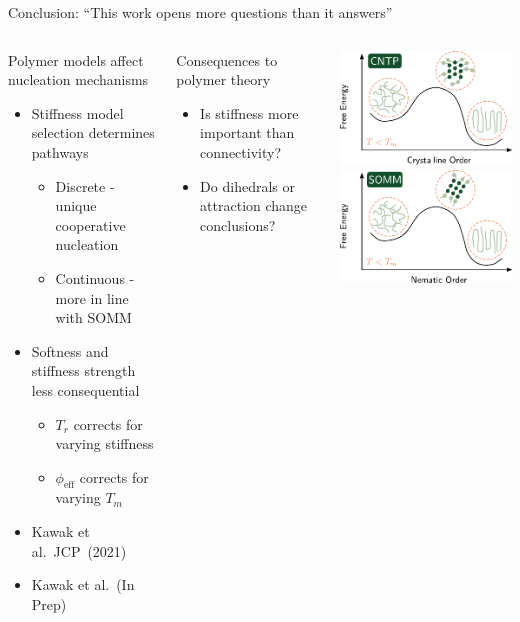 \documentclass[aspectratio=169]{beamer}
\begin{document}
\begin{frame}[c]{Conclusion: ``This work opens more questions than it answers''}

    \begin{columns}[T, onlytextwidth]

      \vspace{-\baselineskip}
      \begin{block}{Polymer models affect nucleation mechanisms}
        \begin{itemize}
            \item Stiffness model selection determines pathways
          \begin{itemize}
            \item Discrete - unique cooperative nucleation
            \item Continuous - more in line with SOMM
          \end{itemize}
          \item Softness and stiffness strength less consequential
          \begin{itemize}
            \item $T_{r}$ corrects for varying stiffness
            \item $\phi_{\mathrm{eff}}$ corrects for varying $T_{m}$
          \end{itemize}
          \item {\small{}Kawak et al.~JCP~(2021)\par}
          \item {\small{}Kawak et al.~(In Prep) \par}
        \end{itemize}
      \end{block}
      \begin{block}{Consequences to polymer theory}
        \begin{itemize} 
          \item Is stiffness more important than connectivity?
          \item Do dihedrals or attraction change conclusions?
        \end{itemize}
      \end{block}

      \centering
      \includegraphics[width=139pt]{figs/fig-CNTP_Free_Energy.pdf}
      \includegraphics[width=139pt]{figs/fig-SOMM_Free_Energy.pdf}


\end{columns}
\end{frame}
\end{document}
